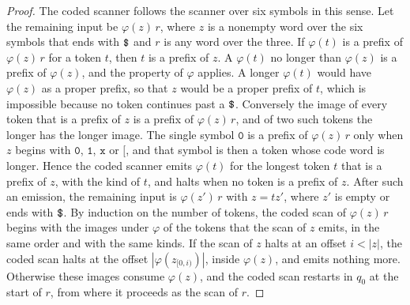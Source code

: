 \documentclass[11pt,a4paper]{article}
\theoremstyle{definition}
\theoremstyle{plain}
\newcommand{\code}[1]{\texttt{#1}}
\begin{document}
\begin{proof}
The coded scanner follows the scanner over six symbols in this sense. Let the remaining input be $\varphi(z)\,r$, where
$z$ is a nonempty word over the six symbols that ends with $\code{\symbol{36}}$ and $r$ is any word over the three. If
$\varphi(t)$ is a prefix of $\varphi(z)\,r$ for a token $t$, then $t$ is a prefix of $z$. A $\varphi(t)$ no longer than
$\varphi(z)$ is a prefix of $\varphi(z)$, and the property of $\varphi$ applies. A longer $\varphi(t)$ would have
$\varphi(z)$ as a proper prefix, so that $z$ would be a proper prefix of $t$, which is impossible because no token
continues past a $\code{\symbol{36}}$. Conversely the image of every token that is a prefix of $z$ is a prefix of
$\varphi(z)\,r$, and of two such tokens the longer has the longer image. The single symbol $\code{0}$ is a prefix of
$\varphi(z)\,r$ only when $z$ begins with $\code{0}$, $\code{1}$, $\code{x}$ or $\code{[}$, and that symbol is then a
token whose code word is longer. Hence the coded scanner emits $\varphi(t)$ for the longest token $t$ that is a prefix
of $z$, with the kind of $t$, and halts when no token is a prefix of $z$. After such an emission, the remaining input is
$\varphi(z')\,r$ with $z = tz'$, where $z'$ is empty or ends with $\code{\symbol{36}}$. By induction on the number of
tokens, the coded scan of $\varphi(z)\,r$ begins with the images under $\varphi$ of the tokens that the scan of $z$
emits, in the same order and with the same kinds. If the scan of $z$ halts at an offset $i < |z|$, the coded scan halts
at the offset $|\varphi(z_{[0,i)})|$, inside $\varphi(z)$, and emits nothing more. Otherwise these images consume
$\varphi(z)$, and the coded scan restarts in $q_0$ at the start of $r$, from where it proceeds as the scan of $r$.


\end{proof}
\end{document}

